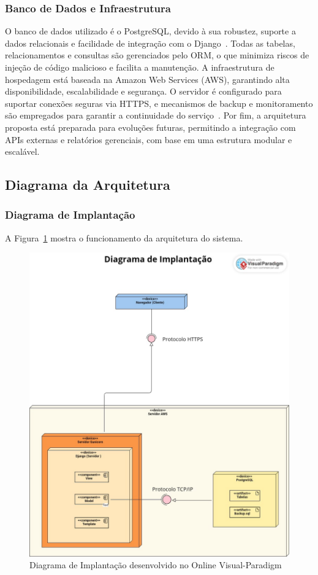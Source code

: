 \documentclass[
	12pt,				%
	openany,			%
	twoside,			%
	a4paper,			%
	english,			%
	french,				%
	spanish,			%
	brazil				%
	]{abntex2}
\begin{document}
\subsubsection{Banco de Dados e Infraestrutura}

O banco de dados utilizado é o PostgreSQL, devido à sua robustez, suporte a dados relacionais e facilidade de integração com o Django~\cite{postgresql}. Todas as tabelas, relacionamentos e consultas são gerenciados pelo ORM, o que minimiza riscos de injeção de código malicioso e facilita a manutenção.
A infraestrutura de hospedagem está baseada na Amazon Web Services (AWS), garantindo alta disponibilidade, escalabilidade e segurança. O servidor é configurado para suportar conexões seguras via HTTPS, e mecanismos de backup e monitoramento são empregados para garantir a continuidade do serviço~\cite{aws-doc}.
Por fim, a arquitetura proposta está preparada para evoluções futuras, permitindo a integração com APIs externas e relatórios gerenciais, com base em uma estrutura modular e escalável.


\subsection{Diagrama da Arquitetura}
\subsubsection{Diagrama de Implantação}
A Figura~\ref{fig:diagramaimplantação} mostra o funcionamento da arquitetura do sistema.

\begin{figure}[H]
	\centering
	\includegraphics[width=\textwidth]{Diagrama de Implantação- Digitalização da Pousada.JPEG}
	\caption{Diagrama de Implantação desenvolvido no Online Visual-Paradigm}
	\label{fig:diagramaimplantação}
\end{figure}
\end{document}
